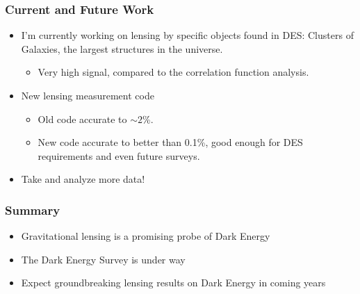 \documentclass{beamer}
\begin{document}
\frame
{

    \frametitle{Current and Future Work}
 
 
    \begin{itemize}


        \item I'm currently working on lensing by specific objects found in
            DES: {\color{gold} Clusters of Galaxies}, the largest structures in the universe.

        \begin{itemize}
            \item Very high signal, compared to the correlation function analysis.
        \end{itemize}

        \item New lensing measurement code
        \begin{itemize}
            \item Old code accurate to $\sim 2$\%.

            \item New code accurate to better than {\color{gold} 0.1\%}, good
                enough for DES requirements and even future surveys.

        \end{itemize}

        \item Take and analyze more data!

    \end{itemize}

}




\frame
{

    \frametitle{Summary}
 
 
    \begin{itemize}

        \item Gravitational lensing is a promising probe of Dark Energy

        \item The Dark Energy Survey is under way

        \item Expect groundbreaking lensing results on Dark Energy in coming years

    \end{itemize}

}
\end{document}
